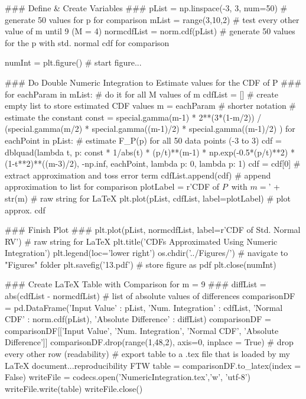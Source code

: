 \documentclass[12pt]{article}
\begin{document}
\begin{enumerate}
\begin{tcblisting}
### Define & Create Variables ###
pList = np.linspace(-3, 3, num=50) # generate 50 values for p for comparison
mList = range(3,10,2) # test every other value of m until 9 (M = 4)
normcdfList = norm.cdf(pList) # generate 50 values for the p with std. normal cdf for comparison

numInt = plt.figure() # start figure...

### Do Double Numeric Integration to Estimate values for the CDF of P ###
for eachParam in mList: # do it for all M values of m
	cdfList = [] # create empty list to store estimated CDF values
	m = eachParam # shorter notation
	# estimate the constant
	const = special.gamma(m-1) * 2**(3*(1-m/2)) / (special.gamma(m/2) * special.gamma((m-1)/2) * special.gamma((m-1)/2) )
	for eachPoint in pList: # estimate F_P(p) for all 50 data points (-3 to 3)
		cdf = dblquad(lambda t, p: const * 1/abs(t) * (p/t)**(m-1) * np.exp(-0.5*(p/t)**2) * (1-t**2)**((m-3)/2), -np.inf, eachPoint, lambda p: 0, lambda p: 1)
		cdf = cdf[0] # extract approximation and toss error term
		cdfList.append(cdf) # append approximation to list for comparison
	plotLabel = r'CDF of $P \,$ with $m=$' + str(m) # raw string for LaTeX
	plt.plot(pList, cdfList, label=plotLabel) # plot approx. cdf

### Finish Plot ###
plt.plot(pList, normcdfList, label=r'CDF of Std. Normal RV') # raw string for LaTeX
plt.title('CDFs Approximated Using Numeric Integration')
plt.legend(loc='lower right')
os.chdir('../Figures/') # navigate to "Figures" folder
plt.savefig('13.pdf') # store figure as pdf
plt.close(numInt)

### Create LaTeX Table with Comparison for m = 9 ###
diffList = abs(cdfList - normcdfList) # list of absolute values of differences
comparisonDF = pd.DataFrame({'Input Value' : pList, 'Num. Integration' : cdfList, 'Normal CDF' : norm.cdf(pList), 'Absolute Difference' : diffList})
comparisonDF = comparisonDF[['Input Value', 'Num. Integration', 'Normal CDF', 'Absolute Difference']]
comparisonDF.drop(range(1,48,2), axis=0, inplace = True) # drop every other row (readability)
# export table to a .tex file that is loaded by my LaTeX document...reproducibility FTW
table = comparisonDF.to_latex(index = False)
writeFile = codecs.open('NumericIntegration.tex','w', 'utf-8')
writeFile.write(table)
writeFile.close()
\end{tcblisting}


\end{enumerate}
\end{document}
